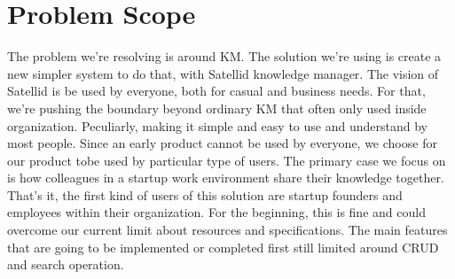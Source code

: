 \section{Problem Scope}
\label{sec:problem-scope}

The problem we're resolving is around \ac{KM}.
The solution we're using is create a new simpler system to do that, with Satellid knowledge manager.
The vision of Satellid is be used by everyone, both for casual and business needs.
For that, we're pushing the boundary beyond ordinary \ac{KM} that often only used inside organization.
Peculiarly, making it simple and easy to use and understand by most people.
Since an early product cannot be used by everyone, we choose for our product tobe used by particular type of users.
The primary case we focus on is how colleagues in a startup work environment share their knowledge together. That's it, the first kind of users of this solution are startup founders and employees within their organization.
For the beginning, this is fine and could overcome our current limit about resources and specifications.
The main features that are going to be implemented or completed first still limited around \ac{CRUD} and search operation.
